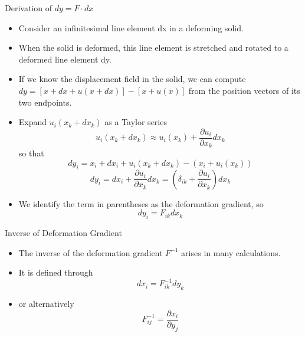 \documentclass[aspectratio=169,11pt]{beamer}
\begin{document}
\begin{frame}{Derivation of  $dy = F \cdot dx$}
  \begin{itemize}
    \item   Consider an infinitesimal line element dx in a deforming solid.
    \item   When the solid is deformed, this line element is stretched and rotated to a deformed line element dy.
    \item   If we know the displacement field in the solid, we can compute \(dy = [x + dx + u(x + dx)] - [x + u(x)]\) from the position vectors of its two endpoints.
    \item   Expand \(u_{i}(x_{k}+dx_{k})\) as a Taylor series
    $$ u_{i}(x_{k}+dx_{k}) \approx u_{i}(x_{k})+\frac{\partial u_{i}}{\partial x_{k}}dx_{k} $$
    so that
    $$ dy_{i}=x_{i}+dx_{i}+u_{i}(x_{k}+dx_{k})-(x_{i}+u_{i}(x_{k})) $$
    $$ dy_{i}=dx_{i}+\frac{\partial u_{i}}{\partial x_{k}}dx_{k}=(\delta_{ik}+\frac{\partial u_{i}}{\partial x_{k}})dx_{k} $$
    \item   We identify the term in parentheses as the deformation gradient, so
    $$ dy_{i}=F_{ik}dx_{k} $$
  \end{itemize}
\end{frame}

\begin{frame}{Inverse of Deformation Gradient}
  \begin{itemize}
    \item   The inverse of the deformation gradient \(F^{-1}\) arises in many calculations.
    \item   It is defined through
    $$ dx_{i}=F_{ik}^{-1}dy_{k} $$
    \item   or alternatively
    $$ F_{ij}^{-1}=\frac{\partial x_{i}}{\partial y_{j}} $$
  \end{itemize}
\end{frame}
\end{document}
